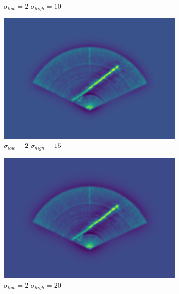 \begin{figure}[H]
\begin{subfigure}[b]{.32\textwidth}
        \caption{\(\sigma_{low} = 2\) \(\sigma_{high} = 10\)}
    \end{subfigure}
    \hfill
    \begin{subfigure}[b]{.32\textwidth}
        \centering
        \includegraphics[width=\textwidth]{figures/bandpassing/2_15.png}
        \caption{\(\sigma_{low} = 2\) \(\sigma_{high} = 15\)}
    \end{subfigure}
    \hfill
    \begin{subfigure}[b]{.32\textwidth}
        \centering
        \includegraphics[width=\textwidth]{figures/bandpassing/2_20.png}
        \caption{\(\sigma_{low} = 2\) \(\sigma_{high} = 20\)}
    \end{subfigure}
    \hfill
    \begin{subfigure}[b]{.32\textwidth}
        \centering

\end{subfigure}
\end{figure}
